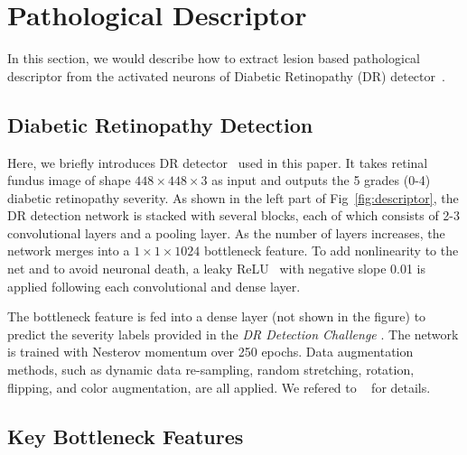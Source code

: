 \documentclass[letterpaper]{article} %
\begin{document}
\section{Pathological Descriptor}

In this section, we would describe how to extract lesion based pathological descriptor from the activated neurons of Diabetic Retinopathy (DR) detector~\cite{oO2016detector}.%






	\subsection{Diabetic Retinopathy Detection}
  Here, we  briefly introduces  DR detector~\cite{oO2016detector} used in this paper. It takes retinal fundus image of shape $448 \times 448 \times 3$ as input  and outputs the 5 grades (0-4) diabetic retinopathy severity.
   As shown in the left part of Fig~\ref{fig:descriptor}, the DR detection network is stacked with several blocks, each of which consists of 2-3 convolutional layers and a pooling layer. As the number of layers increases, the network merges into a  $ 1\times 1 \times 1024$ bottleneck feature. To add nonlinearity to the net and to avoid neuronal death, a leaky ReLU~\cite{maas2013rectifier} with negative slope 0.01 is applied following each convolutional and dense layer.

   The bottleneck feature is fed into a dense layer (not shown in the figure) to predict the severity labels provided in the \textit{DR Detection Challenge} \cite{kaggle2016diabetic}. The network is trained with Nesterov momentum over 250 epochs. Data augmentation methods, such as dynamic data re-sampling, random stretching, rotation, flipping, and color augmentation, are all applied. We refered to ~\cite{oO2016detector} for details.

















    \subsection{Key Bottleneck Features}
\end{document}
